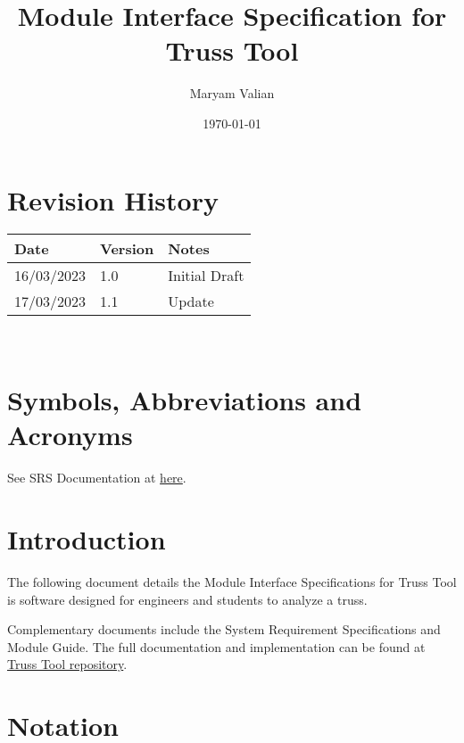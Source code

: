 \documentclass[12pt, titlepage]{article}
\begin{document}
\title{Module Interface Specification for Truss Tool}

\author{Maryam Valian}

\date{\today}

\maketitle


\section{Revision History}

\begin{tabularx}{\textwidth}{p{3cm}p{2cm}X}
\toprule {\bf Date} & {\bf Version} & {\bf Notes}\\
\midrule
16/03/2023 & 1.0 & Initial Draft\\
17/03/2023 & 1.1 & Update\\
\bottomrule
\end{tabularx}

~\newpage

\section{Symbols, Abbreviations and Acronyms}

See SRS Documentation at \href{https://github.com/Maryamvalian/project741/blob/main/docs/SRS/SRS.pdf}{here}. 
\newpage

\tableofcontents

\newpage


\section{Introduction}

The following document details the Module Interface Specifications for
Truss Tool is software designed for engineers and students to analyze a truss.

Complementary documents include the System Requirement Specifications
and Module Guide.  The full documentation and implementation can be
found at \href{https://github.com/Maryamvalian/project741}{Truss Tool repository}.

\section{Notation}
\end{document}
